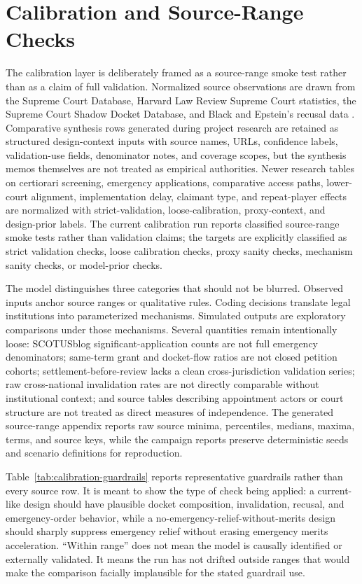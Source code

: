 \documentclass[
    journal=jlc,
    manuscript=research-article,
    year=2026,
  ]{cup-journal}
\newcommand{\jlcite}[1]{\autocite{#1}}
\newcommand{\jlcite}[1]{\citep{#1}}
\begin{document}
\section{Calibration and Source-Range Checks}

The calibration layer is deliberately framed as a source-range smoke test rather than as a claim of full validation. Normalized source observations are drawn from the Supreme Court Database, Harvard Law Review Supreme Court statistics, the Supreme Court Shadow Docket Database, and Black and Epstein's recusal data \jlcite{SupremeCourtDatabaseCodebook2025,HarvardLawReviewStatistics2025,ShadowDocketDatabase2025,BlackEpsteinRecusal}. Comparative synthesis rows generated during project research are retained as structured design-context inputs with source names, URLs, confidence labels, validation-use fields, denominator notes, and coverage scopes, but the synthesis memos themselves are not treated as empirical authorities. Newer research tables on certiorari screening, emergency applications, comparative access paths, lower-court alignment, implementation delay, claimant type, and repeat-player effects are normalized with strict-validation, loose-calibration, proxy-context, and design-prior labels. The current calibration run reports classified source-range smoke tests rather than validation claims; the targets are explicitly classified as strict validation checks, loose calibration checks, proxy sanity checks, mechanism sanity checks, or model-prior checks.

The model distinguishes three categories that should not be blurred. Observed inputs anchor source ranges or qualitative rules. Coding decisions translate legal institutions into parameterized mechanisms. Simulated outputs are exploratory comparisons under those mechanisms. Several quantities remain intentionally loose: SCOTUSblog significant-application counts are not full emergency denominators; same-term grant and docket-flow ratios are not closed petition cohorts; settlement-before-review lacks a clean cross-jurisdiction validation series; raw cross-national invalidation rates are not directly comparable without institutional context; and source tables describing appointment actors or court structure are not treated as direct measures of independence. The generated source-range appendix reports raw source minima, percentiles, medians, maxima, terms, and source keys, while the campaign reports preserve deterministic seeds and scenario definitions for reproduction.

Table~\ref{tab:calibration-guardrails} reports representative guardrails rather than every source row. It is meant to show the type of check being applied: a current-like design should have plausible docket composition, invalidation, recusal, and emergency-order behavior, while a no-emergency-relief-without-merits design should sharply suppress emergency relief without erasing emergency merits acceleration. ``Within range'' does not mean the model is causally identified or externally validated. It means the run has not drifted outside ranges that would make the comparison facially implausible for the stated guardrail use.
\end{document}
